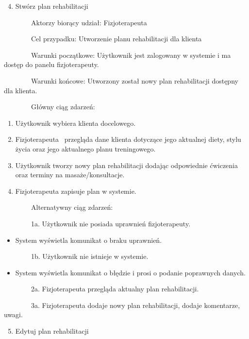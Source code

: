\documentclass[
]{article}
\providecommand{\tightlist}{%
  \setlength{\itemsep}{0pt}\setlength{\parskip}{0pt}}
\begin{document}
\begin{enumerate}
\setcounter{enumi}{3}
\tightlist
\item
  {Stwórz plan rehabilitacji}
\end{enumerate}

{~~~~~~~~}{Aktorzy biorący udział: Fizjoterapeuta}

{~~~~~~~~Cel przypadku: Utworzenie planu rehabilitacji dla klienta}

{~~~~~~~~Warunki początkowe: Użytkownik jest zalogowany w systemie i ma
dostęp do panelu fizjoterapeuty.}

{~~~~~~~~Warunki końcowe: Utworzony został nowy plan rehabilitacji
dostępny dla klienta.}

{~~~~~~~~Główny ciąg zdarzeń:}

\begin{enumerate}
\tightlist
\item
  {Użytkownik wybiera klienta docelowego.}
\item
  {Fizjoterapeuta ~przegląda dane klienta dotyczące jego aktualnej
  diety, stylu życia oraz jego aktualnego planu treningowego.}
\item
  {Użytkownik tworzy nowy plan rehabilitacji dodając odpowiednie
  ćwiczenia oraz terminy na masaże/konsultacje.}
\item
  {Fizjoterapeuta zapisuje plan w systemie.}
\end{enumerate}

{~~~~~~~~Alternatywny ciąg zdarzeń:}

{~~~~~~~~1a. Użytkownik nie posiada uprawnień fizjoterapeuty.}

\begin{itemize}
\tightlist
\item
  {System wyświetla komunikat o braku uprawnień.}
\end{itemize}

{~~~~~~~~1b. Użytkownik nie istnieje w systemie.}

\begin{itemize}
\tightlist
\item
  {System wyświetla komunikat o błędzie i prosi o podanie poprawnych
  danych.}
\end{itemize}

{~~~~~~~~2a. Fizjoterapeuta przegląda aktualny plan rehabilitacji.}

{~~~~~~~~3a. Fizjoterapeuta dodaje nowy plan rehabilitacji, dodaje
komentarze, uwagi.}

{}

\begin{enumerate}
\setcounter{enumi}{4}
\tightlist
\item
  {Edytuj plan rehabilitacji}
\end{enumerate}
\end{document}
